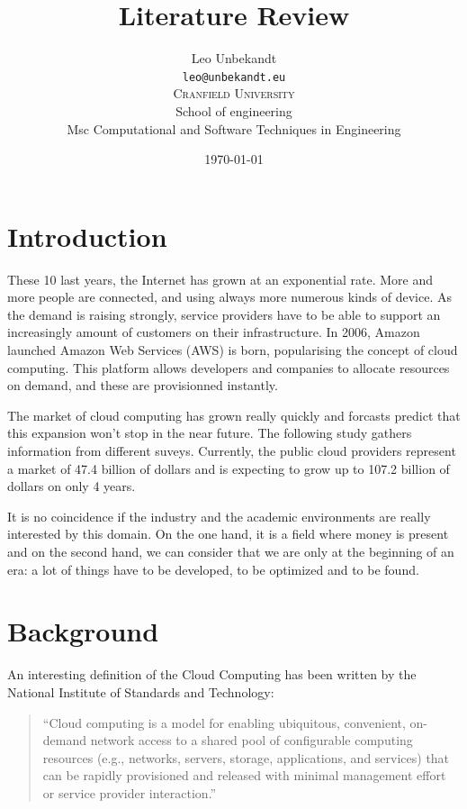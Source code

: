 \documentclass[a4paper,11pt]{article}
\author{Leo Unbekandt \\
 \texttt{leo@unbekandt.eu} \vspace{1em} \\
 \textsc{Cranfield University} \\
 School of engineering \\
 Msc Computational and Software Techniques in Engineering
}
\title{Literature Review}
\date{\today}
\begin{document}
\maketitle
\tableofcontents

\section*{Introduction}

These 10 last years, the Internet has grown at an exponential rate. More and
more people are connected, and using always more numerous kinds of device.
As the demand is raising strongly, service providers have to be able to support
an increasingly amount of customers on their infrastructure. In 2006, Amazon
launched Amazon Web Services (AWS) is born, popularising the concept of cloud
computing. This platform allows developers and companies to allocate resources
on demand, and these are provisionned instantly.

The market of cloud computing has grown really quickly and forcasts predict
that this expansion won't stop in the near future. The following study gathers
information from different suveys\cite{website:cloudcomputingmarket}.
Currently, the public cloud providers represent a market of 47.4 billion of
dollars and is expecting to grow up to 107.2 billion of dollars on only 4
years.

It is no coincidence if the industry and the academic environments are really
interested by this domain. On the one hand, it is a field where money is
present and on the second hand, we can consider that we are only at the
beginning of an era: a lot of things have to be developed, to be optimized and
to be found.

\section{Background}

An interesting definition of the Cloud Computing\cite{nistcloudcomputing} has
been written by the National Institute of Standards and Technology:

\begin{quote}
	“Cloud computing is a model for enabling ubiquitous, convenient, on-demand
	network access to a shared pool of configurable computing resources (e.g.,
	networks, servers, storage, applications, and services) that can be rapidly
	provisioned and released with minimal management effort or service provider
	interaction.”
\end{quote}
\end{document}
